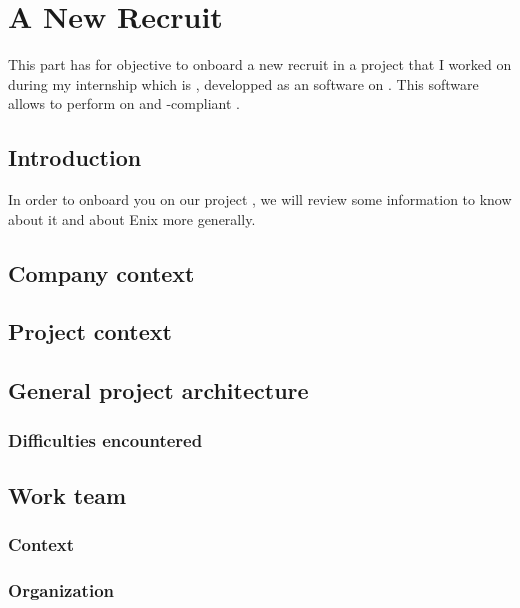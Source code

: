 \chapter{A New Recruit}


This part has for objective to onboard a new recruit in a project that I worked on during my internship which is \saniscsicsi, developped as an  software on . This software allows to perform  on  and -compliant .

\clearpage

\section{Introduction}

In order to onboard you on our project \saniscsicsi, we will review some information to know about it and about Enix more generally.

\section{Company context}

\section{Project context}

\section{General project architecture}
\subsection{Difficulties encountered}

\section{Work team}
\subsection{Context}
\subsection{Organization}

\clearpage

